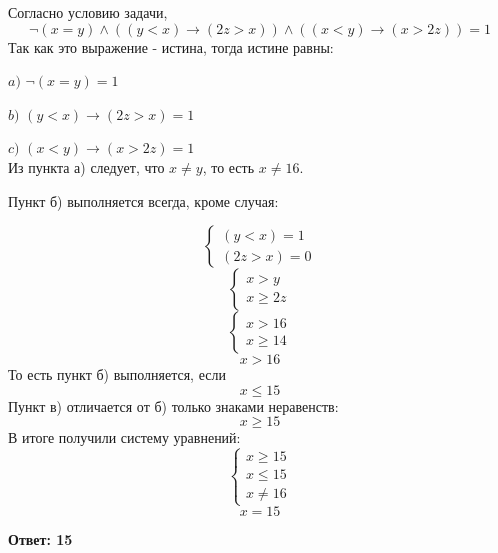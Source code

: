 \documentclass[a4paper,14pt]{article} %
\begin{document}
Согласно условию задачи,
\[ \neg{(x=y)} \land((y<x) \to (2z>x)) \land((x<y) \to (x>2z)) =1\]
Так как это выражение - истина, тогда истине равны:

$a)$ $\neg{(x=y)}=1$ 

$b)$ $(y<x) \to (2z>x)=1$

$c)$ $(x<y) \to (x>2z)=1$ \\

Из пункта а) следует, что $x \neq y$, то есть $x \neq 16$.

Пункт б) выполняется всегда, кроме случая:

\[\begin{cases}
  (y < x) = 1\\
  (2z>x)=0
\end{cases}\] 
\[\begin{cases}
  x>y\\
  x\geqslant 2z
\end{cases}\]
 \[\begin{cases}
  x>16\\
  x\geqslant 14
\end{cases}\]
\[ x>16\]
То есть пункт б) выполняется, если
\[ x\leqslant15\]
Пункт в) отличается от б) только знаками неравенств:
\[ x\geqslant15\]
В итоге получили систему уравнений:
\[\begin{cases}
  x\geqslant15\\
  x\leqslant15\\
  x \neq 16
\end{cases}\]
\[x = 15\]
\begin{flushright}
\begin{large}
\textbf {Ответ: 15}
\end{large}
\end{flushright}

\newpage
\end{document}
